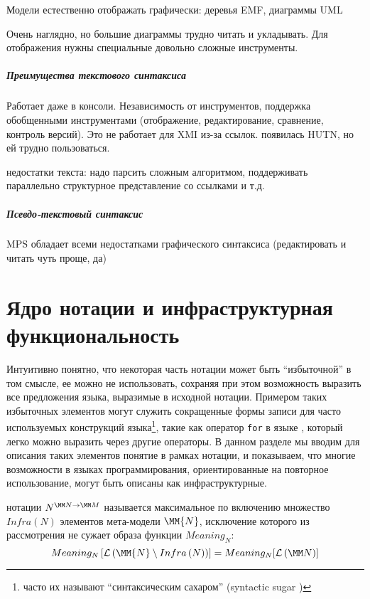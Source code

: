 {Модели естественно отображать графически: деревья EMF, диаграммы UML

Очень наглядно, но большие диаграммы трудно читать и укладывать.
Для отображения нужны специальные довольно сложные инструменты.

\paragraph*{Преимущества текстового синтаксиса}

Работает даже в консоли. Независимость от инструментов, поддержка обобщенными инструментами (отображение, редактирование, сравнение, контроль версий). Это не работает для XMI из-за ссылок. появилась HUTN, но ей трудно пользоваться.

недостатки текста: надо парсить сложным алгоритмом, поддерживать параллельно структурное представление со ссылками и т.д.

\paragraph*{Псевдо-текстовый синтаксис}

MPS обладает всеми недостатками графического синтаксиса (редактировать и читать чуть проще, да)

\chapter{Ядро нотации и инфраструктурная функциональность}

Интуитивно понятно, что некоторая часть нотации может быть ``избыточной'' в том смысле, ее можно не использовать, сохраняя при этом возможность выразить все предложения языка, выразимые в исходной нотации. Примером таких избыточных элементов могут служить сокращенные формы записи для часто используемых конструкций языка\footnote{часто их называют ``синтаксическим сахаром'' (syntactic sugar \cite{???})}, такие как оператор \texttt{for} в языке  \cite{???}, который легко можно выразить через другие операторы. В данном разделе мы вводим для описания таких элементов понятие  в рамках нотации, и показываем, что многие возможности в языках программирования, ориентированные на повторное использование, могут быть описаны как инфраструктурные.

\newcommand{\Infra}[1]{Infra\left(#1\right)}
\newcommand{\Core}[1]{Core\left(#1\right)}

\begin{Def}
 нотации $\N{N}{M}$ называется максимальное по включению множество $\Infra{N}$ элементов мета-модели $\MM{N}$, исключение которого из рассмотрения не сужает образа функции $Meaning_N$:
	$$
		Meaning_N\left[
			\Lang{\MM{N} \setminus \Infra{N}}\right] = Meaning_N[\LMM{N}]
	$$
	

\end{Def}}
